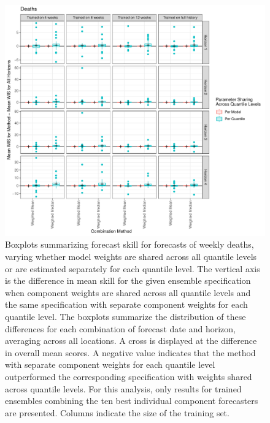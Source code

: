 \documentclass[review]{elsarticle}
\begin{document}
\begin{figure}
  \includegraphics[width=\textwidth]{figures/wis_boxplots_quantile_grouping_Deaths.pdf}
  \caption{Boxplots summarizing forecast skill for forecasts of weekly deaths, varying whether model weights are shared across all quantile levels or are estimated separately for each quantile level.
  The vertical axis is the difference in mean skill for the given ensemble specification when component weights are shared across all quantile levels and the same specification with separate component weights for each quantile level.
  The boxplots summarize the distribution of these differences for each combination of forecast date and horizon, averaging across all locations.
  A cross is displayed at the difference in overall mean scores.
  A negative value indicates that the method with separate component weights for each quantile level outperformed the corresponding specification with weights shared across quantile levels.
  For this analysis, only results for trained ensembles combining the ten best individual component forecasters are presented.
  Columns indicate the size of the training set.}
\end{figure}
\end{document}
